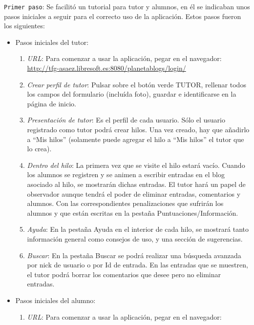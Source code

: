 \documentclass[a4paper, 12pt]{book}
\begin{document}
\texttt{Primer paso}: Se facilit\'o un tutorial para tutor y alumnos, en \'el se indicaban unos pasos iniciales a seguir para el correcto uso de la aplicaci\'on. Estos 
pasos fueron los siguientes:
\begin{itemize}
	\item Pasos iniciales del tutor:
	\begin{enumerate}
		\item \textit{URL}: Para comenzar a usar la aplicaci\'on, pegar en el navegador: \\
		\href{http://tfg-asaez.libresoft.es:8080/planetablogs/login/}{http://tfg-asaez.libresoft.es:8080/planetablogs/login/}
		\item \textit{Crear perfil de tutor}: Pulsar sobre el bot\'on verde TUTOR, rellenar todos los campos del formulario (inclu\'ida foto), guardar e 
		identificarse en la p\'agina de inicio.
		\item \textit{Presentaci\'on de tutor}: Es el perfil de cada usuario. S\'olo el usuario registrado como tutor podr\'a crear hilos. Una vez creado, hay 
		que a\~nadirlo a ``Mis hilos'' (solamente puede agregar el hilo a ``Mis hilos'' el tutor que lo crea).
		\item \textit{Dentro del hilo}: La primera vez que se visite el hilo estar\'a vac\'io. Cuando los alumnos se registren y se animen a escribir entradas 
		en el blog asociado al hilo, se mostrar\'an dichas entradas. El tutor har\'a un papel de observador aunque tendr\'a el poder de eliminar entradas, 
		comentarios y alumnos. Con las correspondientes penalizaciones que sufrir\'an los alumnos y que est\'an escritas en la pesta\~na 
		Puntuaciones/Informaci\'on.
		\item \textit{Ayuda}: En la pesta\~na Ayuda en el interior de cada hilo, se mostrar\'a tanto informaci\'on general como consejos de uso, y una secci\'on 
		de sugerencias.
		\item \textit{Buscar}: En la pesta\~na Buscar se podr\'a realizar una b\'usqueda avanzada por nick de usuario o por Id de entrada. En las entradas que se 
		muestren, el tutor podr\'a borrar los comentarios que desee pero no eliminar entradas.\\
	\end{enumerate}
	\item Pasos iniciales del alumno:
	\begin{enumerate}
		\item \textit{URL}: Para comenzar a usar la aplicaci\'on, pegar en el navegador: \\

\end{enumerate}
\end{itemize}
\end{document}
